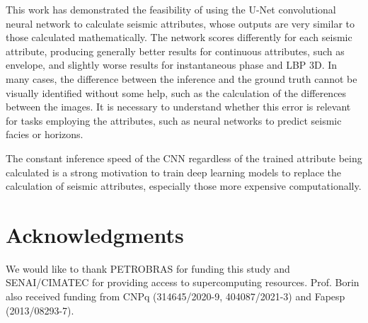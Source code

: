 \documentclass[conference]{IEEEtran}
\def\lbp{LBP 3D\xspace}
\def\unet{\mbox{U-Net}\xspace}
\begin{document}
This work has demonstrated the feasibility of using the \unet convolutional neural network to calculate seismic attributes, whose outputs are very similar to those calculated mathematically. The network scores differently for each seismic attribute, producing generally better results for continuous attributes, such as envelope, and slightly worse results for instantaneous phase and \lbp. In many cases, the difference between the inference and the ground truth cannot be visually identified without some help, such as the calculation of the differences between the images. It is necessary to understand whether this error is relevant for tasks employing the attributes, such as neural networks to predict seismic facies or horizons.



The constant inference speed of the CNN regardless of the trained attribute being calculated is a strong motivation to train deep learning models to replace the calculation of seismic attributes, especially those more expensive computationally.

\section{Acknowledgments}
We would like to thank PETROBRAS for funding this study and %
SENAI/CIMATEC for providing access to supercomputing resources. Prof. Borin also received funding from CNPq (314645/2020-9, 404087/2021-3) and Fapesp (2013/08293-7).
\balance

\end{document}
